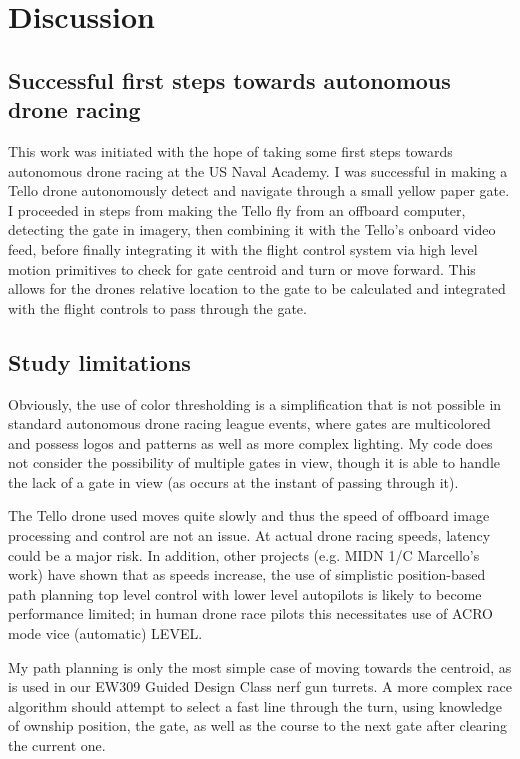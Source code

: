 \section{Discussion}

\subsection{Successful first steps towards autonomous drone racing}
This work was initiated with the hope of taking some first steps towards autonomous drone racing at the US Naval Academy. I was successful in making a Tello drone autonomously detect and navigate through a small yellow paper gate. I proceeded in steps from making the Tello fly from an offboard computer, detecting the gate in imagery, then combining it with the Tello's onboard video feed, before finally integrating it with the flight control system via high level motion primitives to check for gate centroid and turn or move forward. This allows for the drones relative location to the gate to be calculated and integrated with the flight controls to pass through the gate.

\subsection{Study limitations}
Obviously, the use of color thresholding is a simplification that is not possible in standard autonomous drone racing league events, where gates are multicolored and possess logos and patterns as well as more complex lighting.  My code does not consider the possibility of multiple gates in view, though it is able to handle the lack of a gate in view (as occurs at the instant of passing through it). 

The Tello drone used moves quite slowly and thus the speed of offboard image processing and control are not an issue. At actual drone racing speeds, latency could be a major risk. In addition, other projects (e.g. MIDN 1/C Marcello's work) have shown that as speeds increase, the use of simplistic position-based path planning top level control with lower level autopilots is likely to become performance limited; in human drone race pilots this necessitates use of ACRO mode vice (automatic) LEVEL. 

My path planning is only the most simple case of moving towards the centroid, as is used in our EW309 Guided Design Class nerf gun turrets. A more complex race algorithm should attempt to select a fast line through the turn, using knowledge of ownship position, the gate, as well as the course to the next gate after clearing the current one. 

